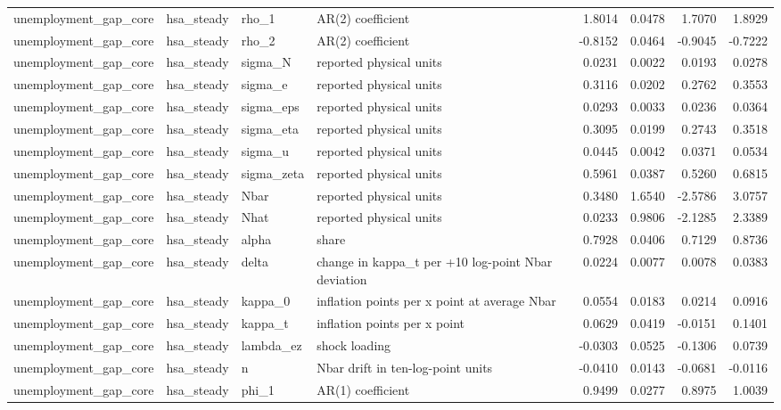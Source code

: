 \begin{tabular}{llllrrrr}
unemployment\_gap\_core & hsa\_steady & rho\_1 & AR(2) coefficient & 1.8014 & 0.0478 & 1.7070 & 1.8929 \\
unemployment\_gap\_core & hsa\_steady & rho\_2 & AR(2) coefficient & -0.8152 & 0.0464 & -0.9045 & -0.7222 \\
unemployment\_gap\_core & hsa\_steady & sigma\_N & reported physical units & 0.0231 & 0.0022 & 0.0193 & 0.0278 \\
unemployment\_gap\_core & hsa\_steady & sigma\_e & reported physical units & 0.3116 & 0.0202 & 0.2762 & 0.3553 \\
unemployment\_gap\_core & hsa\_steady & sigma\_eps & reported physical units & 0.0293 & 0.0033 & 0.0236 & 0.0364 \\
unemployment\_gap\_core & hsa\_steady & sigma\_eta & reported physical units & 0.3095 & 0.0199 & 0.2743 & 0.3518 \\
unemployment\_gap\_core & hsa\_steady & sigma\_u & reported physical units & 0.0445 & 0.0042 & 0.0371 & 0.0534 \\
unemployment\_gap\_core & hsa\_steady & sigma\_zeta & reported physical units & 0.5961 & 0.0387 & 0.5260 & 0.6815 \\
unemployment\_gap\_core & hsa\_steady & Nbar & reported physical units & 0.3480 & 1.6540 & -2.5786 & 3.0757 \\
unemployment\_gap\_core & hsa\_steady & Nhat & reported physical units & 0.0233 & 0.9806 & -2.1285 & 2.3389 \\
unemployment\_gap\_core & hsa\_steady & alpha & share & 0.7928 & 0.0406 & 0.7129 & 0.8736 \\
unemployment\_gap\_core & hsa\_steady & delta & change in kappa\_t per +10 log-point Nbar deviation & 0.0224 & 0.0077 & 0.0078 & 0.0383 \\
unemployment\_gap\_core & hsa\_steady & kappa\_0 & inflation points per x point at average Nbar & 0.0554 & 0.0183 & 0.0214 & 0.0916 \\
unemployment\_gap\_core & hsa\_steady & kappa\_t & inflation points per x point & 0.0629 & 0.0419 & -0.0151 & 0.1401 \\
unemployment\_gap\_core & hsa\_steady & lambda\_ez & shock loading & -0.0303 & 0.0525 & -0.1306 & 0.0739 \\
unemployment\_gap\_core & hsa\_steady & n & Nbar drift in ten-log-point units & -0.0410 & 0.0143 & -0.0681 & -0.0116 \\
unemployment\_gap\_core & hsa\_steady & phi\_1 & AR(1) coefficient & 0.9499 & 0.0277 & 0.8975 & 1.0039 \\

\end{tabular}
